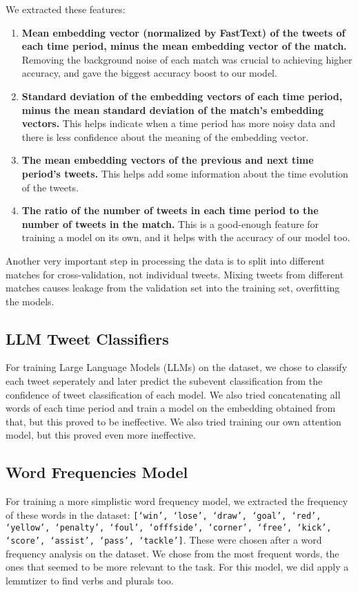 \documentclass[twocolumn]{article}
\begin{document}
We extracted these features:
\begin{enumerate}
    \item \textbf{Mean embedding vector (normalized by FastText) of the tweets of each time period,
        minus the mean embedding vector of the match.} Removing the background noise of each match
        was crucial to achieving higher accuracy, and gave the biggest accuracy boost to our model.
    \item \textbf{Standard deviation of the embedding vectors of each time period, minus the mean
        standard deviation of the match's embedding vectors.} This helps indicate when a time period
        has more noisy data and there is less confidence about the meaning of the embedding vector.
    \item \textbf{The mean embedding vectors of the previous and next time period's tweets.} This
        helps add some information about the time evolution of the tweets.
    \item \textbf{The ratio of the number of tweets in each time period to the number of tweets in
        the match.} This is a good-enough feature for training a model on its own, and it helps
        with the accuracy of our model too.
\end{enumerate}

Another very important step in processing the data is to split into different matches for
cross-validation, not individual tweets. Mixing tweets from different matches causes leakage from
the validation set into the training set, overfitting the models.

\subsection{LLM Tweet Classifiers}
For training Large Language Models (LLMs) on the dataset, we chose to classify each tweet seperately
and later predict the subevent classification from the confidence of tweet classification of each
model. We also tried concatenating all words of each time period and train a model on the embedding
obtained from that, but this proved to be ineffective. We also tried training our own attention
model, but this proved even more ineffective.

\subsection{Word Frequencies Model}
For training a more simplistic word frequency model, we extracted the frequency of these words in
the dataset: \texttt{[`win', `lose', `draw', `goal', `red', `yellow', `penalty', `foul', `offfside',
`corner', `free', `kick', `score', `assist', `pass', `tackle']}. These were chosen after a word
frequency analysis on the dataset. We chose from the most frequent words, the ones that seemed to
be more relevant to the task. For this model, we did apply a lemmtizer to find verbs and plurals
too.
\end{document}
